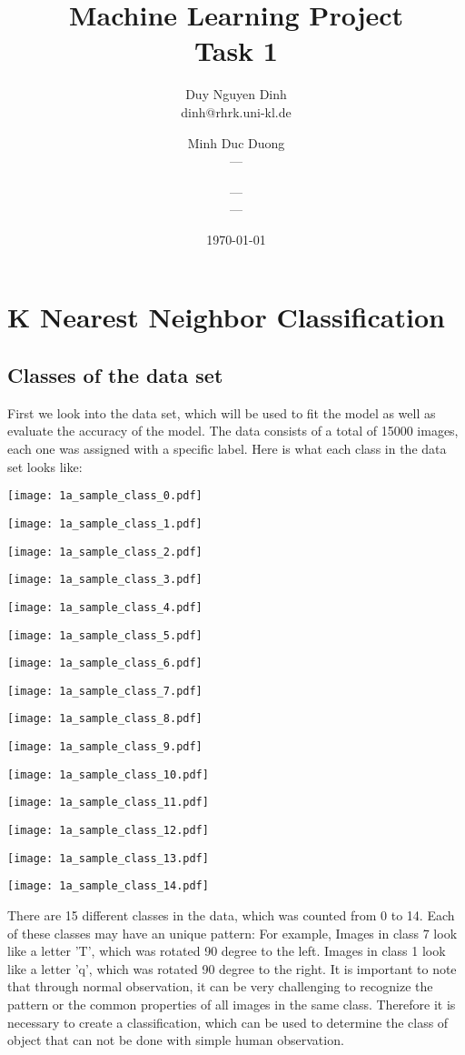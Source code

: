\documentclass[11pt]{article}
\title{Machine Learning Project\\Task 1}
\author{Duy Nguyen Dinh \\ dinh@rhrk.uni-kl.de\and
	Minh Duc Duong\\ ---\and
    ---\\ ---}
\date{\today}
\begin{document}
\maketitle

\section{K Nearest Neighbor Classification}

\subsection{Classes of the data set}
First we look into the data set, which will be used to fit the model as well as evaluate the accuracy of the model. The data consists of a total of 15000 images, each one was assigned with a specific label. Here is what each class in the data set looks like:

\texttt{[image: 1a\_sample\_class\_0.pdf]}

\texttt{[image: 1a\_sample\_class\_1.pdf]}

\texttt{[image: 1a\_sample\_class\_2.pdf]}

\texttt{[image: 1a\_sample\_class\_3.pdf]}

\texttt{[image: 1a\_sample\_class\_4.pdf]}

\texttt{[image: 1a\_sample\_class\_5.pdf]}

\texttt{[image: 1a\_sample\_class\_6.pdf]}

\texttt{[image: 1a\_sample\_class\_7.pdf]}

\texttt{[image: 1a\_sample\_class\_8.pdf]}

\texttt{[image: 1a\_sample\_class\_9.pdf]}

\texttt{[image: 1a\_sample\_class\_10.pdf]}

\texttt{[image: 1a\_sample\_class\_11.pdf]}

\texttt{[image: 1a\_sample\_class\_12.pdf]}

\texttt{[image: 1a\_sample\_class\_13.pdf]}

\texttt{[image: 1a\_sample\_class\_14.pdf]}

There are 15 different classes in the data, which was counted from 0 to 14. Each of these classes may have an unique pattern: For example, Images in class 7 look like a letter 'T', which was rotated 90 degree to the left. Images in class 1 look like a letter 'q', which was rotated 90 degree to the right. It is important to note that through normal observation, it can be very challenging to recognize the pattern or the common properties of all images in the same class. Therefore it is necessary to create a classification, which can be used to determine the class of object that can not be done with simple human observation.
\end{document}
